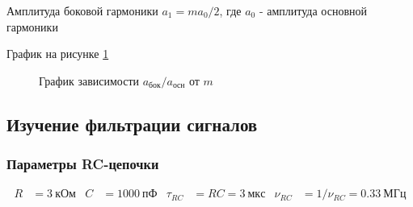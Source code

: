 \documentclass[a4paper, 12pt]{article}
\begin{document}
                Амплитуда боковой гармоники $a_1 = ma_0/2$, где $a_0$ - амплитуда основной гармоники

                График на рисунке \ref{plot:D.23}

                \begin{figure}[ht]
                    \centering
                    \begin{minipage}[ht]{0.49\linewidth}
                        \caption{График зависимости $a_{бок}/a_{осн}$ от $m$}
                        \label{plot:D.23}
                    \end{minipage}
                \end{figure}

        \setcounter{subsection}{5}
        \subsection{Изучение фильтрации сигналов}

            \setcounter{subsubsection}{23}
            \subsubsection{Параметры RC-цепочки}

                \begin{align*}
                    R &= 3~кОм & C &= 1000~пФ & \tau_{RC} &= RC = 3~мкс & \nu_{RC} &= 1/\nu_{RC} = 0.33~МГц
                \end{align*}
\end{document}
